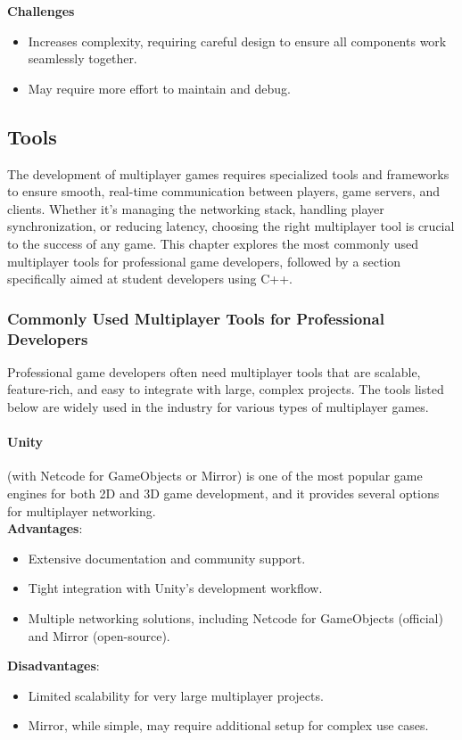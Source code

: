 \documentclass{article} %
\begin{document}
\textbf{Challenges}
\begin{itemize}
    \item Increases complexity, requiring careful design to ensure all components work seamlessly together.
    \item May require more effort to maintain and debug.
\end{itemize}

\subsection{Tools}
The development of multiplayer games requires specialized tools and frameworks to ensure smooth,
real-time communication between players, game servers, and clients. Whether it's managing the networking stack, handling player synchronization, or reducing latency,
choosing the right multiplayer tool is crucial to the success of any game. This chapter explores the most commonly used multiplayer tools for professional game developers,
followed by a section specifically aimed at student developers using C++.

\subsubsection{Commonly Used Multiplayer Tools for Professional Developers}
Professional game developers often need multiplayer tools that are scalable, feature-rich, and easy to integrate with large, complex projects. The tools listed below are widely used in the industry for various types of multiplayer games.

\paragraph{Unity} (with Netcode for GameObjects or Mirror)
is one of the most popular game engines for both 2D and 3D game development,
and it provides several options for multiplayer networking.
\\
\textbf{Advantages}:
\begin{itemize}
    \item Extensive documentation and community support.
    \item Tight integration with Unity's development workflow.
    \item Multiple networking solutions, including Netcode for GameObjects (official) and Mirror (open-source).
\end{itemize}
\textbf{Disadvantages}:
\begin{itemize}
    \item Limited scalability for very large multiplayer projects.
    \item Mirror, while simple, may require additional setup for complex use cases.
\end{itemize}
\end{document}
